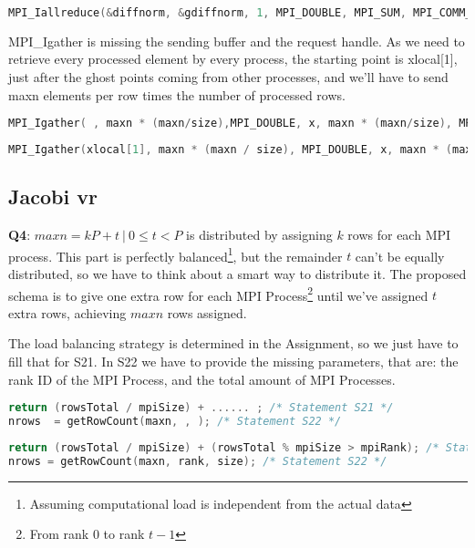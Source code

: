 \documentclass[a4paper, 10pt]{article}
\begin{document}
    \begin{lstlisting}[language=c, caption={Correct S19}]
MPI_Iallreduce(&diffnorm, &gdiffnorm, 1, MPI_DOUBLE, MPI_SUM, MPI_COMM_WORLD, &r[0]); /* S19 */
    \end{lstlisting}

MPI\_Igather is missing the sending buffer and the request handle. As we need to retrieve every processed element by every process, the starting point is xlocal[1], just after the ghost points coming from other processes, and we'll have to send maxn elements per row times the number of processed rows.
    \begin{lstlisting}[language=c, caption={Template 20}]
MPI_Igather( , maxn * (maxn/size),MPI_DOUBLE, x, maxn * (maxn/size), MPI_DOUBLE, 0, MPI_COMM_WORLD, &r[ ]); /* S20 */
    \end{lstlisting}

    \begin{lstlisting}[language=c, caption={Correct 20}]
MPI_Igather(xlocal[1], maxn * (maxn / size), MPI_DOUBLE, x, maxn * (maxn / size), MPI_DOUBLE, 0, MPI_COMM_WORLD, &r[0]); /* S20 */
    \end{lstlisting}


\subsection{Jacobi vr}

\textbf{Q4}: $maxn = kP + t \ | \ 0 \leq t < P$ is distributed by assigning $k$ rows for each MPI process. This part is perfectly balanced\footnote{Assuming computational load is independent from the actual data}, but the remainder $t$ can't be equally distributed, so we have to think about a smart way to distribute it. The proposed schema is to give one extra row for each MPI Process\footnote{From rank 0 to rank $t - 1$} until we've assigned $t$ extra rows, achieving $maxn$ rows assigned.

The load balancing strategy is determined in the Assignment, so we just have to fill that for S21. In S22 we have to provide the missing parameters, that are: the rank ID of the MPI Process, and the total amount of MPI Processes.
    \begin{lstlisting}[language=c, caption={Template S21, S22}]
return (rowsTotal / mpiSize) + ...... ; /* Statement S21 */
nrows  = getRowCount(maxn, , ); /* Statement S22 */
    \end{lstlisting}

    \begin{lstlisting}[language=c, caption={Correct S21, S22}]
return (rowsTotal / mpiSize) + (rowsTotal % mpiSize > mpiRank); /* Statement S21 */
nrows = getRowCount(maxn, rank, size); /* Statement S22 */
    \end{lstlisting}
\end{document}
